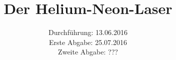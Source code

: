 

\subject{Versuch 61}
\title{Der Helium-Neon-Laser}
\date{Durchführung: 13.06.2016\\
      Erste Abgabe: 25.07.2016\\
      Zweite Abgabe: ???}



\maketitle
\newpage







\printbibliography


